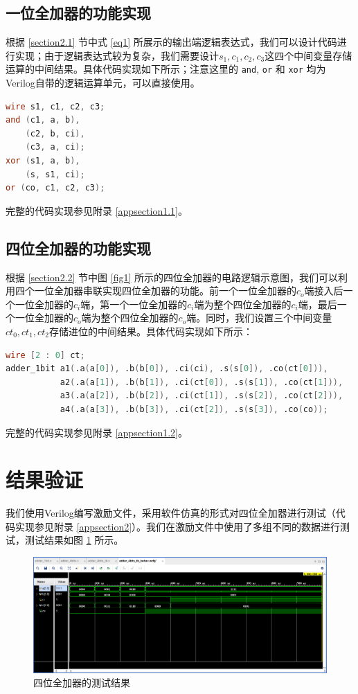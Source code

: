 \documentclass{cumcm}
\numberwithin{equation}{section}
\numberwithin{equation}{subsection}
\begin{document}
\subsection{一位全加器的功能实现}\label{section3.1}

根据 \ref{section2.1} 节中式 \eqref{eq1} 所展示的输出端逻辑表达式，我们可以设计代码进行实现；由于逻辑表达式较为复杂，我们需要设计$s_1,c_1,c_2,c_3$这四个中间变量存储运算的中间结果。具体代码实现如下所示；注意这里的 \texttt{and}, \texttt{or} 和 \texttt{xor} 均为Verilog自带的逻辑运算单元，可以直接使用。

\begin{lstlisting}[language=verilog]
wire s1, c1, c2, c3;
and (c1, a, b),
    (c2, b, ci),
    (c3, a, ci);
xor (s1, a, b),
    (s, s1, ci);
or (co, c1, c2, c3);
\end{lstlisting}

完整的代码实现参见附录 \ref{appsection1.1}。

\subsection{四位全加器的功能实现}\label{section3.2}

根据 \ref{section2.2} 节中图 \ref{fig1} 所示的四位全加器的电路逻辑示意图，我们可以利用四个一位全加器串联实现四位全加器的功能。前一个一位全加器的$c_o$端接入后一个一位全加器的$c_i$端，第一个一位全加器的$c_i$端为整个四位全加器的$c_i$端，最后一个一位全加器的$c_o$端为整个四位全加器的$c_o$端。同时，我们设置三个中间变量$ct_0, ct_1, ct_2$存储进位的中间结果。具体代码实现如下所示：
\begin{lstlisting}[language=verilog]
wire [2 : 0] ct;
adder_1bit a1(.a(a[0]), .b(b[0]), .ci(ci), .s(s[0]), .co(ct[0])),
           a2(.a(a[1]), .b(b[1]), .ci(ct[0]), .s(s[1]), .co(ct[1])),
           a3(.a(a[2]), .b(b[2]), .ci(ct[1]), .s(s[2]), .co(ct[2])),
           a4(.a(a[3]), .b(b[3]), .ci(ct[2]), .s(s[3]), .co(co));
\end{lstlisting}

完整的代码实现参见附录 \ref{appsection1.2}。

\section{结果验证}\label{section4}
我们使用Verilog编写激励文件，采用软件仿真的形式对四位全加器进行测试（代码实现参见附录 \ref{appsection2}）。我们在激励文件中使用了多组不同的数据进行测试，测试结果如图 \ref{fig2} 所示。

\begin{figure}[htbp]
    \centering
    \includegraphics[width=6.3in]{1.png}
    \caption{四位全加器的测试结果}
    \label{fig2}
\end{figure}
\end{document}
